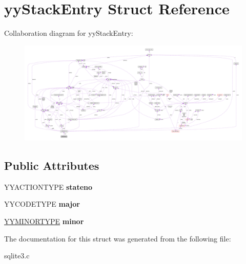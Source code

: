 \hypertarget{structyyStackEntry}{}\section{yy\+Stack\+Entry Struct Reference}
\label{structyyStackEntry}


Collaboration diagram for yy\+Stack\+Entry\+:\nopagebreak
\begin{figure}[H]
\begin{center}
\leavevmode
\includegraphics[width=350pt]{structyyStackEntry__coll__graph}
\end{center}
\end{figure}
\subsection*{Public Attributes}
\begin{DoxyCompactItemize}
\item 
Y\+Y\+A\+C\+T\+I\+O\+N\+T\+Y\+PE {\bfseries stateno}\hypertarget{structyyStackEntry_a108164609c2e841577cc3533d8f0180d}{}\label{structyyStackEntry_a108164609c2e841577cc3533d8f0180d}

\item 
Y\+Y\+C\+O\+D\+E\+T\+Y\+PE {\bfseries major}\hypertarget{structyyStackEntry_a7624d02bcf945d48068f4c383551725c}{}\label{structyyStackEntry_a7624d02bcf945d48068f4c383551725c}

\item 
\hyperlink{unionYYMINORTYPE}{Y\+Y\+M\+I\+N\+O\+R\+T\+Y\+PE} {\bfseries minor}\hypertarget{structyyStackEntry_a024e1e64bce5945080629a2dd8d1bb4f}{}\label{structyyStackEntry_a024e1e64bce5945080629a2dd8d1bb4f}

\end{DoxyCompactItemize}


The documentation for this struct was generated from the following file\+:\begin{DoxyCompactItemize}
\item 
sqlite3.\+c\end{DoxyCompactItemize}
